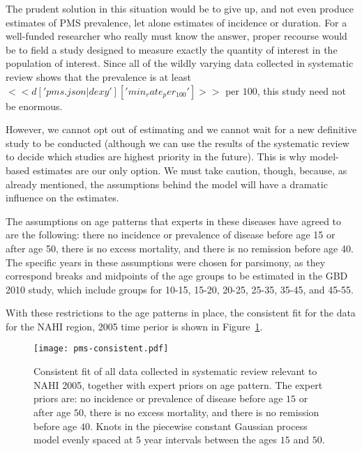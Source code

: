The prudent solution in this situation would be to give up, and not
even produce estimates of PMS prevalence, let alone estimates of incidence or
duration.  For a well-funded researcher who really must know the
answer, proper recourse would be to field a study designed to measure
exactly the quantity of interest in the population of
interest.  Since all of the wildly varying data collected in
systematic review shows that the prevalence is at least
$<<d['pms.json|dexy']['min_rate_per_100']>>$ per $100$, this study
need not be enormous.

However, we cannot opt out of estimating and we cannot wait for a new
definitive study to be conducted (although we can use the results of
the systematic review to decide which studies are highest priority in
the future).  This is why model-based estimates are our only option.
We must take caution, though, because, as already mentioned, the
assumptions behind the model will have a dramatic influence on the
estimates.

The assumptions on age patterns that experts in these diseases have
agreed to are the following: there no incidence or prevalence of
disease before age 15 or after age 50, there is no excess mortality,
and there is no remission before age 40.  The specific years in these
assumptions were chosen for parsimony, as they correspond breaks and
midpoints of the age groups to be estimated in the GBD 2010 study,
which include groups for 10-15, 15-20, 20-25, 25-35, 35-45, and 45-55.

With these restrictions to the age patterns in place, the consistent
fit for the data for the NAHI region, 2005 time perior is shown in
Figure~\ref{pms-consistent}.
\begin{figure}
\begin{center}
\texttt{[image: pms-consistent.pdf]}
\end{center}
\caption{Consistent fit of all data collected in systematic
  review relevant to NAHI 2005, together with expert priors on age pattern.  The expert
  priors are: no incidence or prevalence of disease before age $15$ or
  after age $50$, there is no excess mortality, and there is no
  remission before age $40$.  Knots in the piecewise constant Gaussian
  process model evenly spaced at $5$ year intervals between the ages $15$ and $50$.}
\label{pms-consistent}
\end{figure}

